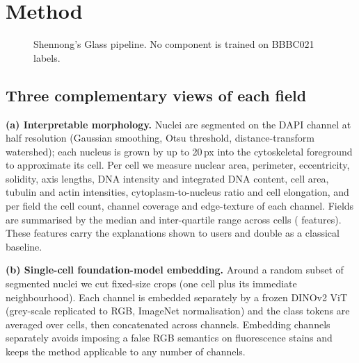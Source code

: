\documentclass[11pt,a4paper]{article}
\begin{document}
\section{Method}
\begin{figure}[t]
\centering
{}
\caption{Shennong's Glass pipeline. No component is trained on BBBC021 labels.}
\label{fig:pipeline}
\end{figure}

\subsection{Three complementary views of each field}
\textbf{(a) Interpretable morphology.} Nuclei are segmented on the DAPI channel at half resolution
(Gaussian smoothing, Otsu threshold, distance-transform watershed); each nucleus is grown by up to
20\,px into the cytoskeletal foreground to approximate its cell. Per cell we measure nuclear area,
perimeter, eccentricity, solidity, axis lengths, DNA intensity and integrated DNA content, cell
area, tubulin and actin intensities, cytoplasm-to-nucleus ratio and cell elongation, and per field
the cell count, channel coverage and edge-texture of each channel. Fields are summarised by the
median and inter-quartile range across cells (\NMorph{} features). These features carry the
explanations shown to users and double as a classical baseline.

\textbf{(b) Single-cell foundation-model embedding.} Around a random subset of segmented nuclei we
cut fixed-size crops (one cell plus its immediate neighbourhood). Each channel is embedded
separately by a frozen DINOv2 ViT (grey-scale replicated to RGB, ImageNet normalisation) and the
class tokens are averaged over cells, then concatenated across channels. Embedding channels
separately avoids imposing a false RGB semantics on fluorescence stains and keeps the method
applicable to any number of channels.
\end{document}
